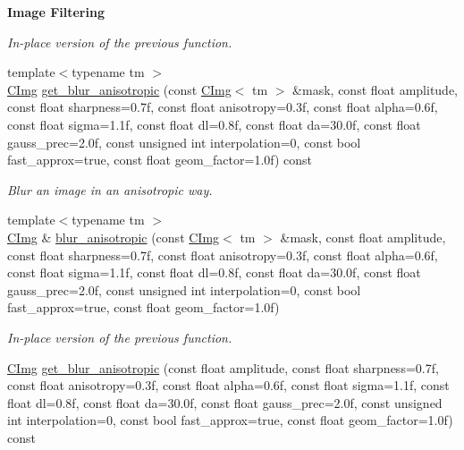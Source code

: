 \begin{Indent}{\bf Image Filtering}
\begin{DoxyCompactItemize}
\begin{DoxyCompactList}\small\item\em In-\/place version of the previous function. \end{DoxyCompactList}\item 
{\footnotesize template$<$typename tm $>$ }\\\hyperlink{structcimg__library_1_1_c_img}{C\-Img} \hyperlink{structcimg__library_1_1_c_img_a6786193cc049ef10155d4ec7396a741c}{get\-\_\-blur\-\_\-anisotropic} (const \hyperlink{structcimg__library_1_1_c_img}{C\-Img}$<$ tm $>$ \&mask, const float amplitude, const float sharpness=0.\-7f, const float anisotropy=0.\-3f, const float alpha=0.\-6f, const float sigma=1.\-1f, const float dl=0.\-8f, const float da=30.\-0f, const float gauss\-\_\-prec=2.\-0f, const unsigned int interpolation=0, const bool fast\-\_\-approx=true, const float geom\-\_\-factor=1.\-0f) const 
\begin{DoxyCompactList}\small\item\em Blur an image in an anisotropic way. \end{DoxyCompactList}\item 
\hypertarget{structcimg__library_1_1_c_img_a2dc5a2c97f4e3c7b38869e39b500e97d}{{\footnotesize template$<$typename tm $>$ }\\\hyperlink{structcimg__library_1_1_c_img}{C\-Img} \& \hyperlink{structcimg__library_1_1_c_img_a2dc5a2c97f4e3c7b38869e39b500e97d}{blur\-\_\-anisotropic} (const \hyperlink{structcimg__library_1_1_c_img}{C\-Img}$<$ tm $>$ \&mask, const float amplitude, const float sharpness=0.\-7f, const float anisotropy=0.\-3f, const float alpha=0.\-6f, const float sigma=1.\-1f, const float dl=0.\-8f, const float da=30.\-0f, const float gauss\-\_\-prec=2.\-0f, const unsigned int interpolation=0, const bool fast\-\_\-approx=true, const float geom\-\_\-factor=1.\-0f)}\label{structcimg__library_1_1_c_img_a2dc5a2c97f4e3c7b38869e39b500e97d}

\begin{DoxyCompactList}\small\item\em In-\/place version of the previous function. \end{DoxyCompactList}\item 
\hypertarget{structcimg__library_1_1_c_img_a3f67a441b852f4adf1f65816851d6b37}{\hyperlink{structcimg__library_1_1_c_img}{C\-Img} \hyperlink{structcimg__library_1_1_c_img_a3f67a441b852f4adf1f65816851d6b37}{get\-\_\-blur\-\_\-anisotropic} (const float amplitude, const float sharpness=0.\-7f, const float anisotropy=0.\-3f, const float alpha=0.\-6f, const float sigma=1.\-1f, const float dl=0.\-8f, const float da=30.\-0f, const float gauss\-\_\-prec=2.\-0f, const unsigned int interpolation=0, const bool fast\-\_\-approx=true, const float geom\-\_\-factor=1.\-0f) const }\label{structcimg__library_1_1_c_img_a3f67a441b852f4adf1f65816851d6b37}


\end{DoxyCompactItemize}
\end{Indent}
